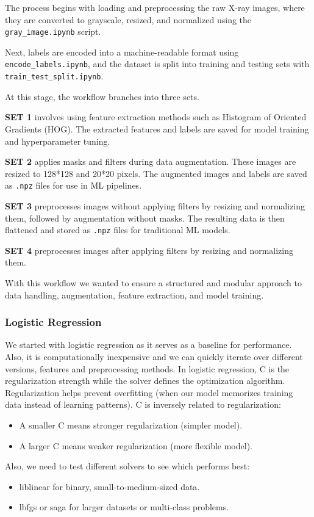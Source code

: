 \documentclass{article}
\begin{document}
The process begins with loading and preprocessing the raw X-ray images, where they are converted to grayscale, resized, and normalized using the \texttt{gray\_image.ipynb} script.

Next, labels are encoded into a machine-readable format using \texttt{encode\_labels.ipynb}, and the dataset is split into training and testing sets with \texttt{train\_test\_split.ipynb}.

At this stage, the workflow branches into three sets.

\textbf{SET 1} involves using feature extraction methods such as Histogram of Oriented Gradients (HOG). The extracted features and labels are saved for model training and hyperparameter tuning.

\textbf{SET 2} applies masks and filters during data augmentation. These images are resized to 128*128 and 20*20 pixels. The augmented images and labels are saved as \texttt{.npz} files for use in ML pipelines.

\textbf{SET 3 } preprocesses images without applying filters by resizing and normalizing them, followed by augmentation without masks. The resulting data is then flattened and stored as \texttt{.npz} files for traditional ML models.

\textbf{SET 4 }preprocesses images after applying filters by resizing and normalizing them.

With this workflow we wanted to ensure a structured and modular approach to data handling, augmentation, feature extraction, and model training.
\\

\subsubsection{Logistic Regression}
We started with logistic regression as it serves as a baseline for performance. Also, it is computationally inexpensive and we can quickly iterate over different versions, features and preprocessing methods. In logistic regression, C is the regularization strength while the solver defines the optimization algorithm.	Regularization helps prevent overfitting (when our model memorizes training data instead of learning patterns).
C is inversely related to regularization:
\begin{itemize}
    \item A smaller C means stronger regularization (simpler model).
    \item A larger C means weaker regularization (more flexible model).
\end{itemize}
Also, we need to test different solvers to see which performs best:
\begin{itemize}
    \item liblinear for binary, small-to-medium-sized data.
    \item lbfgs or saga for larger datasets or multi-class problems.
\end{itemize}
\end{document}

